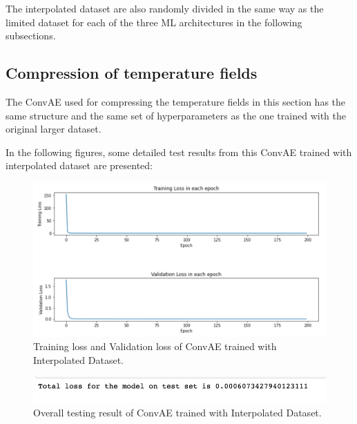 The interpolated dataset are also randomly divided in the same way as the limited dataset for each of the three ML architectures in the following subsections.


\subsection{Compression of temperature fields}

The ConvAE used for compressing the temperature fields in this section has the same structure and the same set of hyperparameters as the one trained with the original larger dataset.

In the following figures, some detailed test results from this ConvAE trained with interpolated dataset are presented:

\begin{figure}[H]
    \caption{Training loss and Validation loss of ConvAE trained with Interpolated Dataset.}
    \includegraphics[scale=0.6]{figures/mantle_convection_images/larger_dataset_interpolated/ConvAE_trainingData.png}
\end{figure}

\begin{figure}[H]
    \caption{Overall testing result of ConvAE trained with Interpolated Dataset.}
    \includegraphics[scale=0.8]{figures/mantle_convection_images/larger_dataset_interpolated/ConvAE_OverallTesting.png}
\end{figure}

